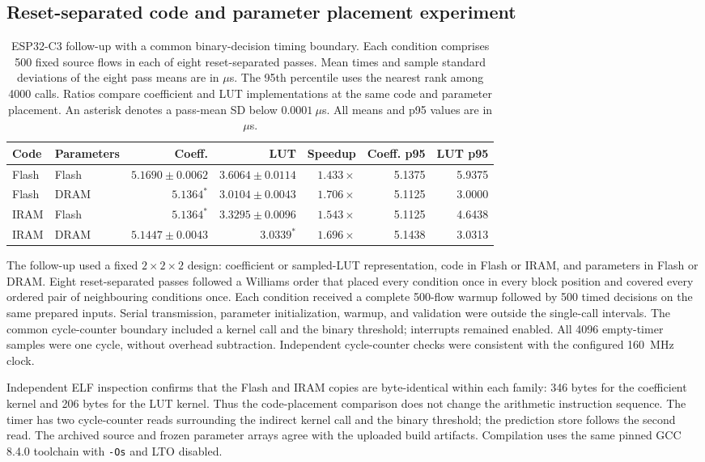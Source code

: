\subsection{Reset-separated code and parameter placement experiment}
\label{sec:c3followup}
\begin{table}[t]
\centering\footnotesize\setlength{\tabcolsep}{4pt}
\caption{ESP32-C3 follow-up with a common binary-decision timing boundary. Each condition comprises 500 fixed source flows in each of eight reset-separated passes. Mean times and sample standard deviations of the eight pass means are in $\mu$s. The 95th percentile uses the nearest rank among 4000 calls. Ratios compare coefficient and LUT implementations at the same code and parameter placement. An asterisk denotes a pass-mean SD below $0.0001~\mu$s. All means and p95 values are in $\mu$s.}
\label{tab:c3_followup}
\begin{tabular}{llrrrrr}
\toprule
Code & Parameters & Coeff. & LUT & Speedup & Coeff. p95 & LUT p95\\
\midrule
Flash & Flash & $5.1690\pm0.0062$ & $3.6064\pm0.0114$ & $1.433\times$ & 5.1375 & 5.9375\\
Flash & DRAM & $5.1364^{*}$ & $3.0104\pm0.0043$ & $1.706\times$ & 5.1125 & 3.0000\\
IRAM & Flash & $5.1364^{*}$ & $3.3295\pm0.0096$ & $1.543\times$ & 5.1125 & 4.6438\\
IRAM & DRAM & $5.1447\pm0.0043$ & $3.0339^{*}$ & $1.696\times$ & 5.1438 & 3.0313\\
\bottomrule
\end{tabular}
\end{table}

The follow-up used a fixed $2\times2\times2$ design: coefficient or sampled-LUT representation, code in Flash or IRAM, and parameters in Flash or DRAM. Eight reset-separated passes followed a Williams order that placed every condition once in every block position and covered every ordered pair of neighbouring conditions once. Each condition received a complete 500-flow warmup followed by 500 timed decisions on the same prepared inputs. Serial transmission, parameter initialization, warmup, and validation were outside the single-call intervals. The common cycle-counter boundary included a kernel call and the binary threshold; interrupts remained enabled. All 4096 empty-timer samples were one cycle, without overhead subtraction. Independent cycle-counter checks were consistent with the configured 160~MHz clock.

Independent ELF inspection confirms that the Flash and IRAM copies are byte-identical within each family: 346 bytes for the coefficient kernel and 206 bytes for the LUT kernel. Thus the code-placement comparison does not change the arithmetic instruction sequence. The timer has two cycle-counter reads surrounding the indirect kernel call and the binary threshold; the prediction store follows the second read. The archived source and frozen parameter arrays agree with the uploaded build artifacts. Compilation uses the same pinned GCC 8.4.0 toolchain with \texttt{-Os} and LTO disabled.

